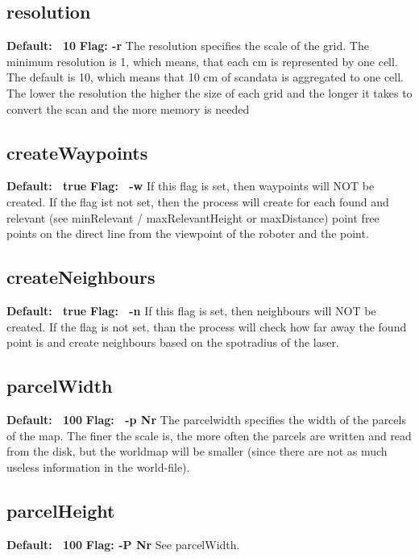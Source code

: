 \documentclass{article}
\begin{document}
\subsection{resolution}
{\bf Default: \ 10} \newline
{\bf Flag: -r} \newline
The resolution specifies the scale of the grid. The minimum resolution is 1, which means, that each cm is represented by one cell. The default is 10, which means that 10 cm of scandata is aggregated to one cell.
The lower the resolution the higher the size of each grid and the longer it takes to convert the scan and the more memory is needed

\subsection{createWaypoints}
{\bf Default: \ true} \newline
{\bf Flag: \ -w} \newline
If this flag is set, then waypoints will NOT be created. If the flag ist not set,
then the process will create for each found and relevant
(see minRelevant / maxRelevantHeight or maxDistance) point
free points on the direct line from the viewpoint of the roboter and the point.


\subsection{createNeighbours}
{\bf Default: \ true} \newline
{\bf Flag: \ -n} \newline
If this flag is set, then neighbours will NOT be created. If the flag is not set,
than the process will check how far away the found point is and create neighbours 
based on the spotradius of the laser.


\subsection{parcelWidth}
{\bf Default: \ 100} \newline
{\bf Flag: \ -p Nr} \newline
The parcelwidth specifies the width of the parcels of the map. The finer the
scale is, the more often the parcels are written and read from the disk, but 
the worldmap will be smaller (since there are not as much useless information
in the world-file).

\subsection{parcelHeight}
{\bf Default: \ 100} \newline
{\bf Flag: -P Nr} \newline
See parcelWidth. 
\end{document}
